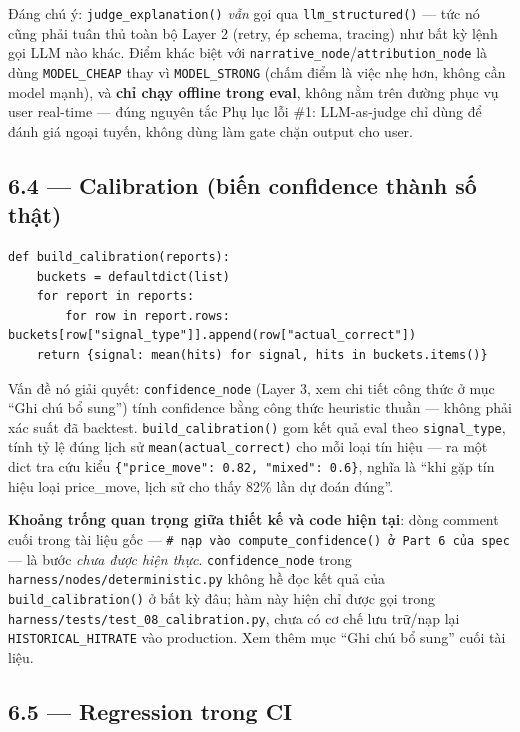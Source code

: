 \documentclass[12pt,a4paper]{article}
\newcommand{\file}[1]{\texttt{#1}}
\begin{document}
Đáng chú ý: \texttt{judge\_explanation()} \emph{vẫn} gọi qua \texttt{llm\_structured()} --- tức nó
cũng phải tuân thủ toàn bộ Layer 2 (retry, ép schema, tracing) như bất kỳ lệnh gọi LLM nào khác.
Điểm khác biệt với \texttt{narrative\_node}/\texttt{attribution\_node} là dùng
\texttt{MODEL\_CHEAP} thay vì \texttt{MODEL\_STRONG} (chấm điểm là việc nhẹ hơn, không cần model
mạnh), và \textbf{chỉ chạy offline trong eval}, không nằm trên đường phục vụ user real-time ---
đúng nguyên tắc Phụ lục lỗi \#1: LLM-as-judge chỉ dùng để đánh giá ngoại tuyến, không dùng làm gate
chặn output cho user.

\subsection{6.4 --- Calibration (biến confidence thành số thật)}

\begin{lstlisting}
def build_calibration(reports):
    buckets = defaultdict(list)
    for report in reports:
        for row in report.rows: buckets[row["signal_type"]].append(row["actual_correct"])
    return {signal: mean(hits) for signal, hits in buckets.items()}
\end{lstlisting}

Vấn đề nó giải quyết: \texttt{confidence\_node} (Layer 3, xem chi tiết công thức ở mục ``Ghi chú
bổ sung'') tính confidence bằng công thức heuristic thuần --- không phải xác suất đã backtest.
\texttt{build\_calibration()} gom kết quả eval theo \texttt{signal\_type}, tính tỷ lệ đúng lịch sử
\texttt{mean(actual\_correct)} cho mỗi loại tín hiệu --- ra một dict tra cứu kiểu
\texttt{\{"price\_move": 0.82, "mixed": 0.6\}}, nghĩa là ``khi gặp tín hiệu loại price\_move,
lịch sử cho thấy 82\% lần dự đoán đúng''.

\textbf{Khoảng trống quan trọng giữa thiết kế và code hiện tại}: dòng comment cuối trong tài liệu
gốc --- \texttt{\# nạp vào compute\_confidence() ở Part 6 của spec} --- là bước \emph{chưa được
hiện thực}. \texttt{confidence\_node} trong \file{harness/nodes/deterministic.py} không hề đọc
kết quả của \texttt{build\_calibration()} ở bất kỳ đâu; hàm này hiện chỉ được gọi trong
\file{harness/tests/test\_08\_calibration.py}, chưa có cơ chế lưu trữ/nạp lại
\texttt{HISTORICAL\_HITRATE} vào production. Xem thêm mục ``Ghi chú bổ sung'' cuối tài liệu.

\subsection{6.5 --- Regression trong CI}
\end{document}
